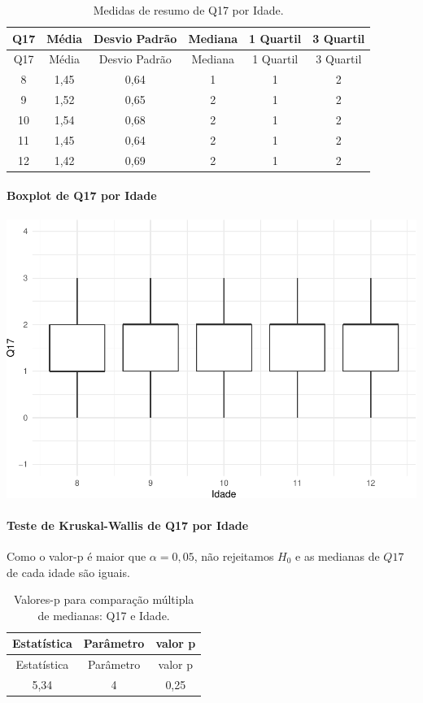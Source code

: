 \documentclass[]{article}
\let\oldparagraph\paragraph
\renewcommand{\paragraph}[1]{\oldparagraph{#1}\mbox{}}
\begin{document}
\begin{longtable}[]{@{}cccccc@{}}
\caption{\label{tab:unnamed-chunk-198}Medidas de resumo de Q17 por Idade.}\tabularnewline
\toprule
Q17 & Média & Desvio Padrão & Mediana & 1 Quartil & 3 Quartil\tabularnewline
\midrule
\endfirsthead
\toprule
Q17 & Média & Desvio Padrão & Mediana & 1 Quartil & 3 Quartil\tabularnewline
\midrule
\endhead
8 & 1,45 & 0,64 & 1 & 1 & 2\tabularnewline
9 & 1,52 & 0,65 & 2 & 1 & 2\tabularnewline
10 & 1,54 & 0,68 & 2 & 1 & 2\tabularnewline
11 & 1,45 & 0,64 & 2 & 1 & 2\tabularnewline
12 & 1,42 & 0,69 & 2 & 1 & 2\tabularnewline
\bottomrule
\end{longtable}

\hypertarget{boxplot-de-q17-por-idade}{%
\paragraph{Boxplot de Q17 por Idade}\label{boxplot-de-q17-por-idade}}

\begin{center}\includegraphics[width=0.75\linewidth]{relatorio_files/figure-latex/unnamed-chunk-199-1} \end{center}

\hypertarget{teste-de-kruskal-wallis-de-q17-por-idade}{%
\paragraph{Teste de Kruskal-Wallis de Q17 por Idade}\label{teste-de-kruskal-wallis-de-q17-por-idade}}

Como o valor-p é maior que \(\alpha=0,05\), não rejeitamos \(H_0\) e as medianas de \(Q17\) de cada idade são iguais.

\begin{longtable}[]{@{}ccc@{}}
\caption{\label{tab:unnamed-chunk-200}Valores-p para comparação múltipla de medianas: Q17 e Idade.}\tabularnewline
\toprule
Estatística & Parâmetro & valor p\tabularnewline
\midrule
\endfirsthead
\toprule
Estatística & Parâmetro & valor p\tabularnewline
\midrule
\endhead
5,34 & 4 & 0,25\tabularnewline
\bottomrule
\end{longtable}
\end{document}
